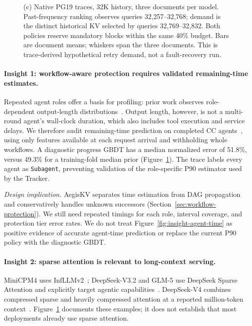 \begin{figure}[t]
{    (c) Native PG19 traces, 32K history, three documents per model.
    Past-frequency ranking observes queries 32,257--32,768; demand is
    the distinct historical KV selected by queries 32,769--32,832.
    Both policies reserve mandatory blocks within the same 40\% budget.
    Bars are document means; whiskers span the three documents. This is
    trace-derived hypothetical retry demand, not a fault-recovery run.}
  \label{fig:design-insights}
\end{figure}

\paragraph{Insight 1: workflow-aware protection requires validated
remaining-time estimates.}
Repeated agent roles offer a basis for profiling: prior work observes
role-dependent output-length distributions~\cite{yu2026pythia}.
Output length, however, is not a multi-round agent's wall-clock duration,
which also includes tool execution and service delays. We therefore
audit remaining-time prediction on completed CC agents~\cite{semianalysis2026cctraces},
using only features available at each request arrival and withholding
whole workflows. A diagnostic progress GBDT has a median normalized
error of 51.8\%, versus 49.3\% for a training-fold median prior
(Figure~\ref{fig:design-insights}).
The trace labels every agent as \texttt{Subagent}, preventing validation
of the role-specific P90 estimator used by the Tracker.

\emph{Design implication.} AegisKV separates time estimation from DAG
propagation and conservatively handles unknown successors
(Section~\ref{sec:workflow-protection}). We still need repeated timings
for each role, interval coverage, and protection tier error rates.
We do not treat Figure~\ref{fig:insight-agent-time} as
positive evidence of accurate agent-time prediction or replace the
current P90 policy with the diagnostic GBDT.

\paragraph{Insight 2: sparse attention is relevant to long-context serving.}
MiniCPM4 uses InfLLMv2~\cite{minicpm4model}; DeepSeek-V3.2 and GLM-5
use DeepSeek Sparse Attention and explicitly target agentic
capabilities~\cite{deepseek2025v32model,zai2026glm5model}.
DeepSeek-V4 combines compressed sparse and heavily compressed attention
at a reported million-token context~\cite{deepseek2026v4model}.
Figure~\ref{fig:design-insights}
documents these examples; it does not establish that most deployments
already use sparse attention.

